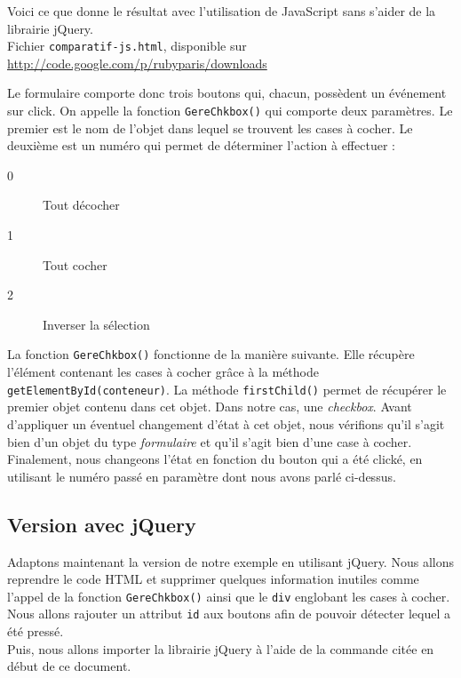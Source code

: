 \documentclass[10pt,a4paper,titlepage]{article}
\begin{document}
Voici ce que donne le résultat avec l'utilisation de JavaScript sans s'aider de la librairie jQuery. \\

Fichier \texttt{comparatif-js.html}, disponible sur \url{http://code.google.com/p/rubyparis/downloads}



Le formulaire comporte donc trois boutons qui, chacun, possèdent un événement sur click. On appelle la fonction \texttt{GereChkbox()} qui comporte deux paramètres. Le premier est le nom de l'objet dans lequel se trouvent les cases à cocher. Le deuxième est un numéro qui permet de déterminer l'action à effectuer : 


\begin{description}
	\item[0] Tout décocher
	\item[1] Tout cocher
	\item[2] Inverser la sélection
\end{description}

La fonction \texttt{GereChkbox()} fonctionne de la manière suivante. Elle récupère l'élément contenant les cases à cocher grâce à la méthode \texttt{getElementById(conteneur)}. La méthode \texttt{firstChild()} permet de récupérer le premier objet contenu dans cet objet. Dans notre cas, une \emph{checkbox}. Avant d'appliquer un éventuel changement d'état à cet objet, nous vérifions qu'il s'agit bien d'un objet du type \emph{formulaire} et qu'il s'agit bien d'une case à cocher. Finalement, nous changeons l'état en fonction du bouton qui a été clické, en utilisant le numéro passé en paramètre dont nous avons parlé ci-dessus.

\subsection{Version avec jQuery}

Adaptons maintenant la version de notre exemple en utilisant jQuery. Nous allons reprendre le code HTML et supprimer quelques information inutiles comme l'appel de la fonction \texttt{GereChkbox()} ainsi que le \texttt{div} englobant les cases à cocher. \\

Nous allons rajouter un attribut \texttt{id} aux boutons afin de pouvoir détecter lequel a été pressé. \\

Puis, nous allons importer la librairie jQuery à l'aide de la commande citée en début de ce document. 
\end{document}
